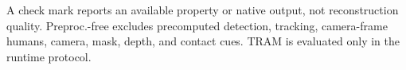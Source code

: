 \begin{table}[t]
  \centering
  \caption{Temporal access, preprocessing, and native output scope of the evaluated public methods.}
  \label{tab:method-scope}
  \scriptsize
  \setlength{\tabcolsep}{2.8pt}
  \vspace{0.5mm}

  \parbox{0.98\columnwidth}{\scriptsize A check mark reports an available property or native output, not reconstruction quality. Preproc.-free excludes precomputed detection, tracking, camera-frame humans, camera, mask, depth, and contact cues. TRAM is evaluated only in the runtime protocol.}
\end{table}
